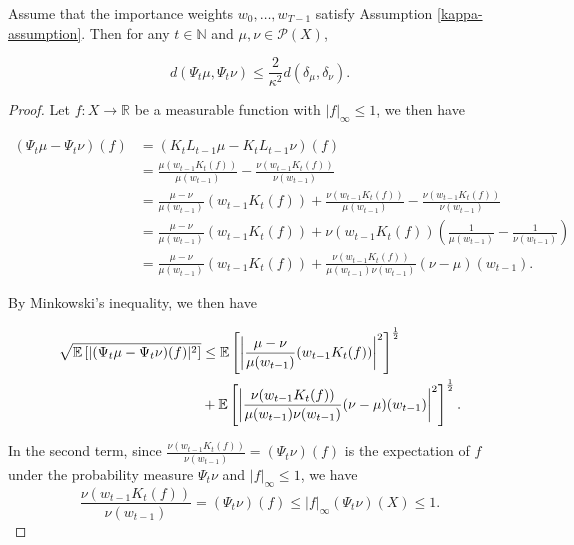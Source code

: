 \begin{lemma} \label{seq-bound}
  Assume that the importance weights $w_0, \ldots, w_{T-1}$ satisfy Assumption \ref{kappa-assumption}. Then for any $t \in \mathbb{N}$ and $\mu, \nu \in \mathcal{P}(X)$,

  \begin{equation*}
    d(\Psi_t\mu, \Psi_t\nu) \leq \frac2{\kappa^2}d(\delta_\mu, \delta_\nu).
  \end{equation*}
\end{lemma}

\begin{proof}
  Let $f : X \rightarrow \mathbb{R}$ be a measurable function with $|f|_\infty \le 1$, we then have

  \begin{equation*}
    \begin{aligned}
      (\Psi_t\mu - \Psi_t\nu)(f)
      &= (K_tL_{t-1}\mu - K_tL_{t-1}\nu)(f) \\
      &= \frac{\mu(w_{t-1}K_t(f))}{\mu(w_{t-1})} - \frac{\nu(w_{t-1}K_t(f))}{\nu(w_{t-1})} \\
      &= \frac{\mu - \nu}{\mu(w_{t-1})}(w_{t-1}K_t(f)) + \frac{\nu(w_{t-1}K_t(f))}{\mu(w_{t-1})} - \frac{\nu(w_{t-1}K_t(f))}{\nu(w_{t-1})}\\
      &= \frac{\mu - \nu}{\mu(w_{t-1})}(w_{t-1}K_t(f)) + \nu(w_{t-1}K_t(f))\left(\frac1{\mu(w_{t-1})} - \frac1{\nu(w_{t-1})}\right)\\
      &= \frac{\mu - \nu}{\mu(w_{t-1})}(w_{t-1}K_t(f)) + \frac{ \nu(w_{t-1}K_t(f))}{\mu(w_{t-1})\nu(w_{t-1})}(\nu - \mu)(w_{t-1}).
    \end{aligned}
  \end{equation*}
  
  By Minkowski's inequality, we then have

  \begin{equation*}
    \begin{aligned}
      \sqrt{\mathbb{E}\left[|(\Psi_t\mu - \Psi_t\nu)(f)|^2\right]}
      &\leq \mathbb{E}\left[\left|\frac{\mu - \nu}{\mu(w_{t-1})}(w_{t-1}K_t(f))\right|^2\right]^{\frac12}\\
      &+ \mathbb{E}\left[\left|\frac{ \nu(w_{t-1}K_t(f))}{\mu(w_{t-1})\nu(w_{t-1})}(\nu - \mu)(w_{t-1})\right|^2\right]^{\frac12}      .
    \end{aligned}
  \end{equation*}


  In the second term, since $\frac{\nu(w_{t-1}K_t(f))}{\nu(w_{t-1})} = (\Psi_t \nu)(f)$ is the expectation of $f$ under the probability measure $\Psi_t\nu$ and $|f|_\infty \le 1$, we have
  \begin{equation*}
    \frac{\nu(w_{t-1}K_t(f))}{\nu(w_{t-1})} = (\Psi_t\nu)(f) \le |f|_\infty(\Psi_t\nu)(X) \le 1.
  \end{equation*}


\end{proof}
